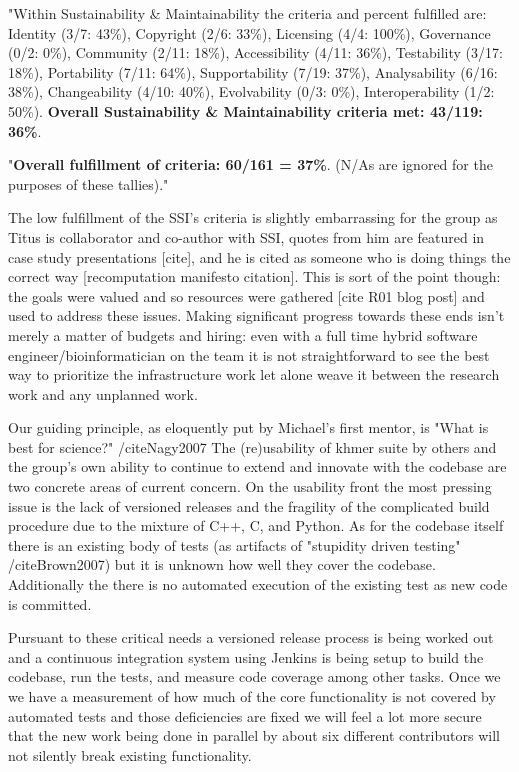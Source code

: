 \documentclass{article}
\begin{document}
"Within Sustainability \& Maintainability the criteria and percent fulfilled are:
Identity (3/7: 43\%), Copyright (2/6: 33\%), Licensing (4/4: 100\%), Governance
(0/2: 0\%), Community (2/11: 18\%), Accessibility (4/11: 36\%), Testability (3/17:
18\%), Portability (7/11: 64\%), Supportability (7/19: 37\%), Analysability (6/16:
38\%), Changeability (4/10: 40\%), Evolvability (0/3: 0\%), Interoperability (1/2:
50\%). \textbf{Overall Sustainability \& Maintainability criteria met: 43/119:
36\%}.

"\textbf{Overall fulfillment of criteria: 60/161 = 37\%}. (N/As are ignored for the
purposes of these tallies)."

The low fulfillment of the SSI's criteria is slightly embarrassing for the group
as Titus is collaborator and co-author with SSI, quotes from him are featured
in case study presentations [cite], and he is cited as someone who is doing
things the correct way [recomputation manifesto citation]. This is sort of the
point though: the goals were valued and so resources were gathered [cite R01
blog post] and used to address these issues. Making significant progress towards
these ends isn't merely a matter of budgets and hiring: even with a full time hybrid
software engineer/bioinformatician on the team it is not straightforward to see
the best way to prioritize the infrastructure work let alone weave it between
the research work and any unplanned work.

Our guiding principle, as eloquently put by Michael's first mentor, is "What is
best for science?" /cite{Nagy2007} The (re)usability of khmer suite by others
and the group's own ability to continue to extend and innovate with the codebase
are two concrete areas of current concern. On the usability front the most
pressing issue is the lack of versioned releases and the fragility of the
complicated build procedure due to the mixture of C++, C, and Python. As for the
codebase itself there is an existing body of tests (as artifacts of "stupidity
driven testing" /cite{Brown2007}) but it is unknown how well they cover the codebase.
Additionally the there is no automated execution of the existing test as new
code is committed.

Pursuant to these critical needs a versioned release process is being worked out
and a continuous integration system using Jenkins is being setup to build the
codebase, run the tests, and measure code coverage among other tasks. Once we
we have a measurement of how much of the core functionality is not covered by
automated tests and those deficiencies are fixed we will feel a lot more secure
that the new work being done in parallel by about six different contributors
will not silently break existing functionality.
\end{document}
